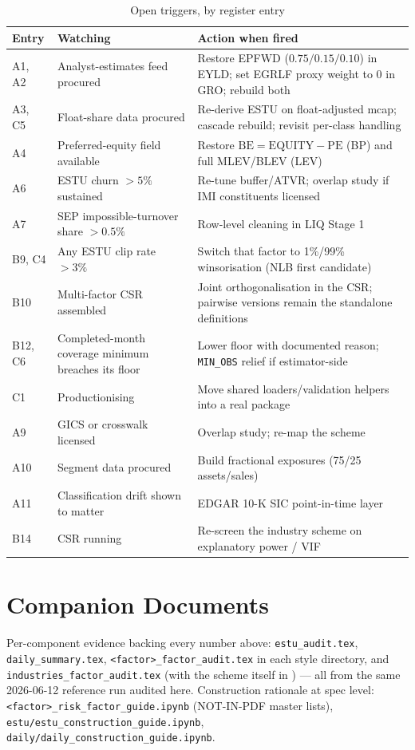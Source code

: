 \documentclass[11pt,a4paper]{article}
\begin{document}
\begin{longtable}{@{}p{1.2cm}p{5.6cm}p{6.8cm}@{}}
\caption{Open triggers, by register entry}\\
\toprule
\textbf{Entry} & \textbf{Watching} & \textbf{Action when fired} \\
\midrule
\endhead
A1, A2 & Analyst-estimates feed procured & Restore EPFWD ($0.75/0.15/0.10$) in EYLD; set EGRLF proxy weight to 0 in GRO; rebuild both \\[4pt]
A3, C5 & Float-share data procured & Re-derive ESTU on float-adjusted mcap; cascade rebuild; revisit per-class handling \\[4pt]
A4 & Preferred-equity field available & Restore $\mathrm{BE}=\mathrm{EQUITY}-\mathrm{PE}$ (BP) and full MLEV/BLEV (LEV) \\[4pt]
A6 & ESTU churn $>5\%$ sustained & Re-tune buffer/ATVR; overlap study if IMI constituents licensed \\[4pt]
A7 & SEP impossible-turnover share $>0.5\%$ & Row-level cleaning in LIQ Stage 1 \\[4pt]
B9, C4 & Any ESTU clip rate $>3\%$ & Switch that factor to 1\%/99\% winsorisation (NLB first candidate) \\[4pt]
B10 & Multi-factor CSR assembled & Joint orthogonalisation in the CSR; pairwise versions remain the standalone definitions \\[4pt]
B12, C6 & Completed-month coverage minimum breaches its floor & Lower floor with documented reason; \texttt{MIN\_OBS} relief if estimator-side \\[4pt]
C1 & Productionising & Move shared loaders/validation helpers into a real package \\
A9 & GICS or crosswalk licensed & Overlap study; re-map the scheme \\[4pt]
A10 & Segment data procured & Build fractional exposures (75/25 assets/sales) \\[4pt]
A11 & Classification drift shown to matter & EDGAR 10-K SIC point-in-time layer \\[4pt]
B14 & CSR running & Re-screen the industry scheme on explanatory power / VIF \\
\bottomrule
\end{longtable}

\section{Companion Documents}

Per-component evidence backing every number above: \texttt{estu\_audit.tex},
\texttt{daily\_summary.tex}, \texttt{<factor>\_factor\_audit.tex} in each style
directory, and \texttt{industries\_factor\_audit.tex} (with the scheme itself in
) --- all from the same
2026-06-12 reference run audited here.
Construction rationale at spec level: \texttt{<factor>\_risk\_factor\_guide.ipynb}
(NOT-IN-PDF master lists), \texttt{estu/estu\_construction\_guide.ipynb},
\newline\texttt{daily/daily\_construction\_guide.ipynb}.
\end{document}
